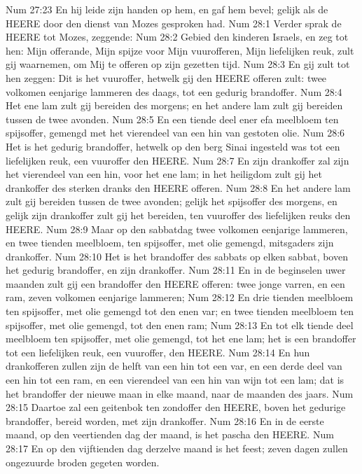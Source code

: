 Num 27:23  En hij leide zijn handen op hem, en gaf hem bevel; gelijk als de HEERE door den dienst van Mozes gesproken had.
Num 28:1  Verder sprak de HEERE tot Mozes, zeggende:
Num 28:2  Gebied den kinderen Israels, en zeg tot hen: Mijn offerande, Mijn spijze voor Mijn vuurofferen, Mijn liefelijken reuk, zult gij waarnemen, om Mij te offeren op zijn gezetten tijd.
Num 28:3  En gij zult tot hen zeggen: Dit is het vuuroffer, hetwelk gij den HEERE offeren zult: twee volkomen eenjarige lammeren des daags, tot een gedurig brandoffer.
Num 28:4  Het ene lam zult gij bereiden des morgens; en het andere lam zult gij bereiden tussen de twee avonden.
Num 28:5  En een tiende deel ener efa meelbloem ten spijsoffer, gemengd met het vierendeel van een hin van gestoten olie.
Num 28:6  Het is het gedurig brandoffer, hetwelk op den berg Sinai ingesteld was tot een liefelijken reuk, een vuuroffer den HEERE.
Num 28:7  En zijn drankoffer zal zijn het vierendeel van een hin, voor het ene lam; in het heiligdom zult gij het drankoffer des sterken dranks den HEERE offeren.
Num 28:8  En het andere lam zult gij bereiden tussen de twee avonden; gelijk het spijsoffer des morgens, en gelijk zijn drankoffer zult gij het bereiden, ten vuuroffer des liefelijken reuks den HEERE.
Num 28:9  Maar op den sabbatdag twee volkomen eenjarige lammeren, en twee tienden meelbloem, ten spijsoffer, met olie gemengd, mitsgaders zijn drankoffer.
Num 28:10  Het is het brandoffer des sabbats op elken sabbat, boven het gedurig brandoffer, en zijn drankoffer.
Num 28:11  En in de beginselen uwer maanden zult gij een brandoffer den HEERE offeren: twee jonge varren, en een ram, zeven volkomen eenjarige lammeren;
Num 28:12  En drie tienden meelbloem ten spijsoffer, met olie gemengd tot den enen var; en twee tienden meelbloem ten spijsoffer, met olie gemengd, tot den enen ram;
Num 28:13  En tot elk tiende deel meelbloem ten spijsoffer, met olie gemengd, tot het ene lam; het is een brandoffer tot een liefelijken reuk, een vuuroffer, den HEERE.
Num 28:14  En hun drankofferen zullen zijn de helft van een hin tot een var, en een derde deel van een hin tot een ram, en een vierendeel van een hin van wijn tot een lam; dat is het brandoffer der nieuwe maan in elke maand, naar de maanden des jaars.
Num 28:15  Daartoe zal een geitenbok ten zondoffer den HEERE, boven het gedurige brandoffer, bereid worden, met zijn drankoffer.
Num 28:16  En in de eerste maand, op den veertienden dag der maand, is het pascha den HEERE.
Num 28:17  En op den vijftienden dag derzelve maand is het feest; zeven dagen zullen ongezuurde broden gegeten worden.
